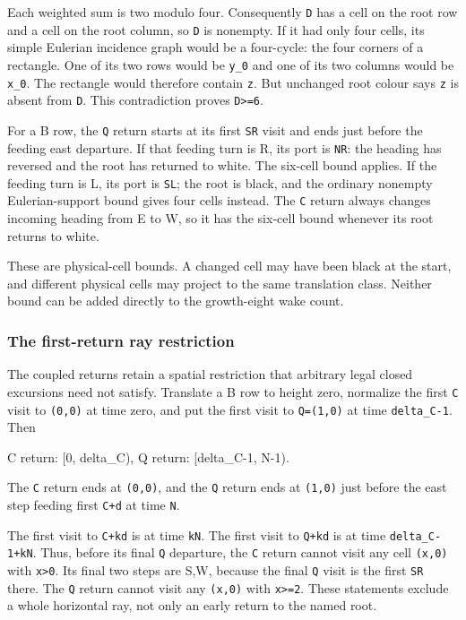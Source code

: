 \documentclass[11pt,letterpaper]{article}
\theoremstyle{plain}
\theoremstyle{definition}
\begin{document}
\begin{NoHyper}
Each weighted sum is two modulo four. Consequently \texttt{D} has a cell on the root row and a cell on the root column, so \texttt{D} is nonempty. If it had only four cells, its simple Eulerian incidence graph would be a four-cycle: the four corners of a rectangle. One of its two rows would be \texttt{y\_0} and one of its two columns would be \texttt{x\_0}. The rectangle would therefore contain \texttt{z}. But unchanged root colour says \texttt{z} is absent from \texttt{D}. This contradiction proves \texttt{\textbar{}D\textbar{}\textgreater{}=6}.

For a B row, the \texttt{Q} return starts at its first \texttt{SR} visit and ends just before the feeding east departure. If that feeding turn is R, its port is \texttt{NR}: the heading has reversed and the root has returned to white. The six-cell bound applies. If the feeding turn is L, its port is \texttt{SL}; the root is black, and the ordinary nonempty Eulerian-support bound gives four cells instead. The \texttt{C} return always changes incoming heading from E to W, so it has the six-cell bound whenever its root returns to white.

These are physical-cell bounds. A changed cell may have been black at the start, and different physical cells may project to the same translation class. Neither bound can be added directly to the growth-eight wake count.

\subsubsection{The first-return ray restriction}

The coupled returns retain a spatial restriction that arbitrary legal closed excursions need not satisfy. Translate a B row to height zero, normalize the first \texttt{C} visit to \texttt{(0,0)} at time zero, and put the first visit to \texttt{Q=(1,0)} at time \texttt{delta\_C-1}. Then

\begin{codeblock}
C return: [0, delta_C),
Q return: [delta_C-1, N-1).
\end{codeblock}

The \texttt{C} return ends at \texttt{(0,0)}, and the \texttt{Q} return ends at \texttt{(1,0)} just before the east step feeding first \texttt{C+d} at time \texttt{N}.

The first visit to \texttt{C+kd} is at time \texttt{kN}. The first visit to \texttt{Q+kd} is at time \texttt{delta\_C-1+kN}. Thus, before its final \texttt{Q} departure, the \texttt{C} return cannot visit any cell \texttt{(x,0)} with \texttt{x\textgreater{}0}. Its final two steps are S,W, because the final \texttt{Q} visit is the first \texttt{SR} there. The \texttt{Q} return cannot visit any \texttt{(x,0)} with \texttt{x\textgreater{}=2}. These statements exclude a whole horizontal ray, not only an early return to the named root.


\end{NoHyper}
\end{document}
